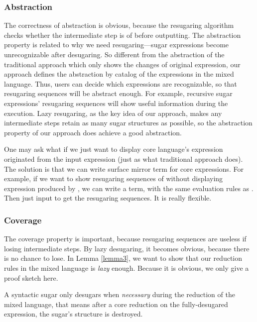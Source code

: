 
\subsubsection{Abstraction}
\label{mark:abs}
The correctness of abstraction is obvious, because the resugaring algorithm checks whether the intermediate step is of  before outputting. The abstraction property is related to why we need resugaring---sugar expressions become unrecognizable after desugaring. So different from the abstraction of the traditional approach which only shows the changes of original expression, our approach defines the abstraction by catalog of the expressions in the mixed language. Thus, users can decide which expressions are recognizable, so that resugaring sequences will be abstract enough. For example, recursive sugar expressions' resugaring sequences will show useful information during the execution. Lazy resugaring, as the key idea of our approach, makes any intermediate steps retain as many sugar structures as possible, so the abstraction property of our approach does achieve a good abstraction.

One may ask what if we just want to display core language's expression originated from the input expression (just as what traditional approach does). The solution is that we can write surface mirror term for core expressions. For example, if we want to show resugaring sequences of  without displaying  expression produced by , we can write a  term, with the same evaluation rules as . Then just input  to get the resugaring sequences. It is really flexible.

\subsubsection{Coverage}
The coverage property is important, because resugaring sequences are useless if losing intermediate steps. By lazy desugaring, it becomes obvious, because there is no chance to lose. In Lemma \ref{lemma3}, we want to show that our reduction rules in the mixed language is \emph{lazy} enough. Because it is obvious, we only give a proof sketch here.
\begin{lemma}[Coverage]
\label{lemma3}
A syntactic sugar only desugars when \emph{necessary} during the reduction of the mixed language, that means after a core reduction on the fully-desugared expression, the sugar's structure is destroyed.
\end{lemma}


